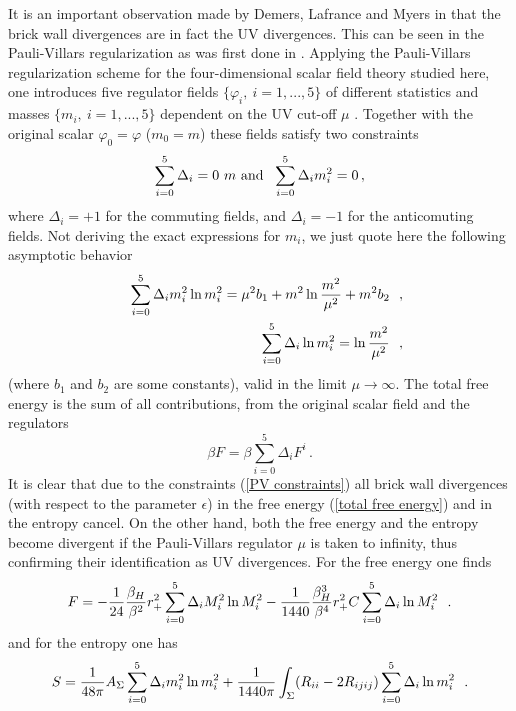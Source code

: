 \documentclass[12pt]{article}
\def\be{\begin{eqnarray}}
\def\ee{\end{eqnarray}}
\def\lb{\label}
\begin{document}
It is an important observation made by Demers, Lafrance and Myers in    \cite{Demers:1995dq}  that the brick wall divergences are in fact the UV divergences. This can be seen in the Pauli-Villars regularization
as was first done in \cite{Demers:1995dq}.  
Applying the Pauli-Villars regularization scheme for 
the   four-dimensional scalar field theory studied here, one introduces
five regulator fields $\{\varphi_i,~i=1,...,5\}$ of different statistics
and masses $\{m_i,~i=1,...,5\}$ dependent on the UV cut-off
$\mu$ \cite{Demers:1995dq}. Together with
the original scalar $\varphi_0=\varphi$ ($m_0=m$) 
these fields satisfy two constraints
\be\sum_{i=0}^5 \Delta_i=0\ m\ {\rm and} \ \ \sum_{i=0}^5 \Delta_im_i^2=0\, ,
\lb{PV constraints}
\ee
where $\Delta_i=+1$ for the commuting fields, and $\Delta_i=-1$
for the anticomuting fields. 
Not deriving the exact expressions for $m_i$, we just quote here
the following  asymptotic behavior
\begin{eqnarray}
&&\sum_{i=0}^5 \Delta_im^2_i\ln m^2_i =\mu^2 b_1+m^2\ln{m^2\over \mu^2}
+m^2 b_2~~, \nonumber \\
&&\sum_{i=0}^5 \Delta_i\ln m^2_i =\ln{m^2\over \mu^2}~~,
\label{PV asymptotes}
\end{eqnarray}
(where $b_1$ and $b_2$ are some constants), valid in the 
limit $\mu \rightarrow \infty$.
The total  free energy is the sum of all contributions, from the original scalar field and the regulators
\begin{equation}
\beta{F}_{}=\beta\sum_{i=0}^5 \Delta_i  F^i\, .
\label{total free energy}
\end{equation}
It is clear that due to the constraints (\ref{PV constraints}) all brick wall divergences (with respect to the parameter $\epsilon$) in the free energy (\ref{total free energy}) and in the entropy  cancel. On the other hand, both the free energy and the entropy become divergent if the Pauli-Villars regulator $\mu$ is taken to infinity, thus confirming their identification as UV divergences. For the free energy one finds
\begin{equation}
F= -{1\over 24} {\beta_H\over \beta^2}r^2_+ 
\sum_{i=0}^5 \Delta_iM^2_i\ln M^2_i 
-{1\over 1440}{\beta_H^3\over \beta^4} r^2_+ C 
\sum_{i=0}^5 \Delta_i\ln M^2_i~~.
\label{free energy PV}
\end{equation}
and for the entropy one has
\begin{eqnarray}
S={1\over 48\pi} A_{\Sigma}
\sum_{i=0}^5 \Delta_im^2_i\ln m^2_i+
{1\over 1440\pi}\int_\Sigma (R_{ii}-
2R_{ijij} )
\sum_{i=0}^5 \Delta_i\ln m^2_i ~~.
\label{entropy PV}
\end{eqnarray}
\end{document}
